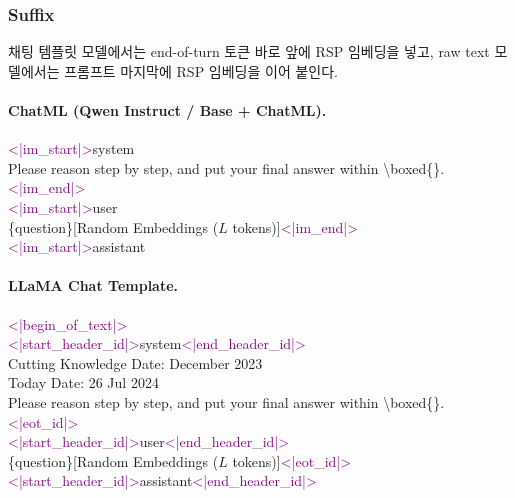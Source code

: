 \subsubsection{Suffix}

채팅 템플릿 모델에서는 end-of-turn 토큰 바로 앞에 RSP 임베딩을 넣고, raw text 모델에서는 프롬프트 마지막에 RSP 임베딩을 이어 붙인다.

\paragraph{ChatML (Qwen Instruct / Base + ChatML).}
\begin{tcolorbox}[colback=gray!5, colframe=black!60, arc=3pt, boxrule=0.5pt, fontupper=\footnotesize\ttfamily, breakable]
\textcolor{purple}{<|im\_start|>}system\\
Please reason step by step, and put your final answer within \textbackslash boxed\{\}.\textcolor{purple}{<|im\_end|>}\\
\textcolor{purple}{<|im\_start|>}user\\
\{question\}\textcolor{blue!70!black}{[Random Embeddings ($L$ tokens)]}\textcolor{purple}{<|im\_end|>}\\
\textcolor{purple}{<|im\_start|>}assistant
\end{tcolorbox}

\paragraph{LLaMA Chat Template.}
\begin{tcolorbox}[colback=gray!5, colframe=black!60, arc=3pt, boxrule=0.5pt, fontupper=\footnotesize\ttfamily, breakable]
\textcolor{purple}{<|begin\_of\_text|>}\\
\textcolor{purple}{<|start\_header\_id|>}system\textcolor{purple}{<|end\_header\_id|>}\\
Cutting Knowledge Date: December 2023\\
Today Date: 26 Jul 2024\\
Please reason step by step, and put your final answer within \textbackslash boxed\{\}.\textcolor{purple}{<|eot\_id|>}\\
\textcolor{purple}{<|start\_header\_id|>}user\textcolor{purple}{<|end\_header\_id|>}\\
\{question\}\textcolor{blue!70!black}{[Random Embeddings ($L$ tokens)]}\textcolor{purple}{<|eot\_id|>}\\
\textcolor{purple}{<|start\_header\_id|>}assistant\textcolor{purple}{<|end\_header\_id|>}
\end{tcolorbox}

